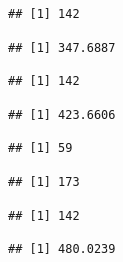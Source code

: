 \documentclass[]{article}
\begin{document}
\begin{verbatim}
## [1] 142
\end{verbatim}

\begin{verbatim}
## [1] 347.6887
\end{verbatim}

\begin{verbatim}
## [1] 142
\end{verbatim}

\begin{verbatim}
## [1] 423.6606
\end{verbatim}

\begin{verbatim}
## [1] 59
\end{verbatim}

\begin{verbatim}
## [1] 173
\end{verbatim}

\begin{verbatim}
## [1] 142
\end{verbatim}

\begin{verbatim}
## [1] 480.0239
\end{verbatim}
\end{document}
